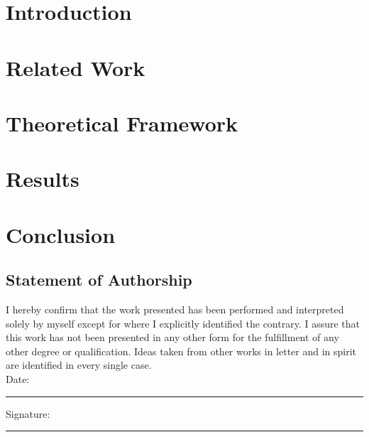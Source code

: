 \documentclass[a4paper,12pt]{report}
\begin{document}
\tableofcontents
\newpage


\chapter{Introduction}
\setcounter{page}{1}

\chapter{Related Work}

\chapter{Theoretical Framework}

\chapter{Results}

\chapter{Conclusion}


\newpage
\appendix
{}


\newpage
\renewcommand{\bibname}{References}
\renewcommand{\thechapter}{R}


\renewcommand{\thechapter}{\arabic{chapter}} %

\newpage
\section*{Statement of Authorship}

I hereby confirm that the work presented has been performed and interpreted solely by myself except for where I explicitly identified the contrary. I assure that this work has not been presented in any other form for the fulfillment of any other degree or qualification. Ideas taken from other works in letter and in spirit are identified in every single case.\\[2cm]

\noindent Date: \rule{4cm}{0.5pt} \hfill Signature: \rule{6cm}{0.5pt}
\end{document}
